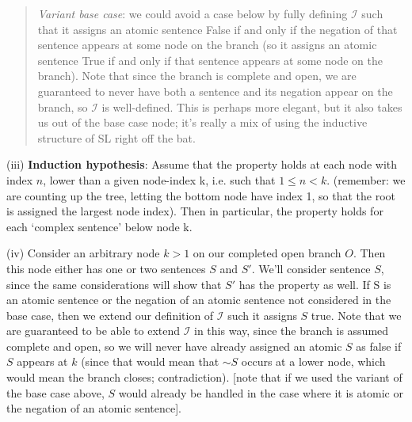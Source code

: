 \documentclass[12pt]{article}
\def\enot{\ensuremath{{\sim}}} %
\let\oldsim\sim %
\renewcommand{\sim}{{\oldsim}} %
\newcommand*{\metav}[1]{\ensuremath{\mathcal{#1}}}
\begin{document}
\begin{enumerate}
\begin{quote}
\textit{Variant base case}: we could avoid a case below by fully defining \metav{I} such that it assigns an atomic sentence False if and only if the negation of that sentence appears at some node on the branch (so it assigns an atomic sentence True if and only if that sentence appears at some node on the branch). Note that since the branch is complete and open, we are guaranteed to never have both a sentence and its negation appear on the branch, so \metav{I} is well-defined. This is perhaps more elegant, but it also takes us out of the base case node; it's really a mix of using the inductive structure of SL right off the bat. 
\end{quote}


(iii) \textbf{Induction hypothesis}: Assume that the property holds at each node with index $n$, lower than a given node-index k, i.e. such that $1 \leq n < k$. (remember: we are counting up the tree, letting the bottom node have index 1, so that the root is assigned the largest node index). Then in particular, the property holds for each `complex sentence' below node k. %

(iv) Consider an arbitrary node $k > 1$ on our completed open branch $O$. Then this node either has one or two sentences $S$ and $S'$. We'll consider sentence $S$, since the same considerations will show that $S'$ has the property as well. If S is an atomic sentence or the negation of an atomic sentence not considered in the base case, then we extend our definition of \metav{I} such it assigns $S$ true. Note that we are guaranteed to be able to extend \metav{I} in this way, since the branch is assumed complete and open, so we will never have already assigned an atomic $S$ as false if $S$ appears at $k$ (since that would mean that $\enot S$ occurs at a lower node, which would mean the branch closes; contradiction). [note that if we used the variant of the base case above, $S$ would already be handled in the case where it is atomic or the negation of an atomic sentence]. 


\end{enumerate}
\end{document}
